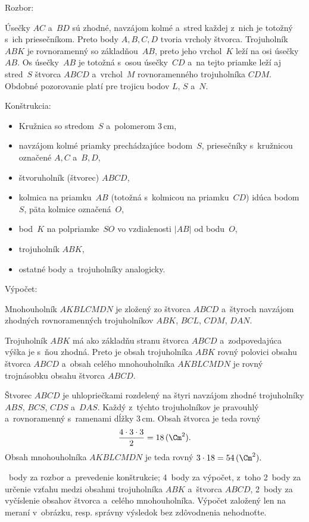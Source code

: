 {%
Rozbor:

Úsečky $AC$ a~$BD$ sú zhodné, navzájom kolmé a~stred každej z~nich je totožný s~ich priesečníkom.
Preto body $A,B,C,D$ tvoria vrcholy štvorca.
Trojuholník $ABK$ je rovnoramenný so základňou~$AB$, preto jeho vrchol~$K$ leží na osi úsečky~$AB$.
Os úsečky~$AB$ je totožná s~osou úsečky~$CD$ a~na tejto priamke leží aj stred~$S$ štvorca $ABCD$ a~vrchol~$M$ rovnoramenného trojuholníka $CDM$.
Obdobné pozorovanie platí pre trojicu bodov $L$, $S$ a~$N$.
%

\medskip

Konštrukcia:
\begin{itemize}
\item Kružnica so stredom~$S$ a~polomerom 3\,cm,
\item navzájom kolmé priamky prechádzajúce bodom~$S$, priesečníky s~kružnicou označené $A,C$ a~$B,D$,
\item štvoruholník (štvorec) $ABCD$,
\item kolmica na priamku~$AB$ (totožná s~kolmicou na priamku~$CD$) idúca bodom~$S$, päta kolmice označená~$O$,
\item bod~$K$ na polpriamke~$SO$ vo vzdialenosti $|AB|$ od bodu~$O$,
\item trojuholník $ABK$,
\item ostatné body a~trojuholníky analogicky.
\end{itemize}

\medskip
Výpočet:

Mnohouholník $AKBLCMDN$ je zložený zo štvorca $ABCD$ a~štyroch navzájom zhodných rovnoramenných trojuholníkov $ABK$, $BCL$, $CDM$, $DAN$.

Trojuholník $ABK$ má ako základňu stranu štvorca $ABCD$ a~zodpovedajúca výška je s~ňou zhodná.
Preto je obsah trojuholníka $ABK$ rovný polovici obsahu štvorca $ABCD$ a~obsah celého mnohouholníka $AKBLCMDN$ je rovný trojnásobku obsahu štvorca $ABCD$.

Štvorec $ABCD$ je uhlopriečkami rozdelený na štyri navzájom zhodné trojuholníky $ABS$, $BCS$, $CDS$ a~$DAS$.
Každý z~týchto trojuholníkov je pravouhlý a~rovnoramenný s~ramenami dĺžky 3\,cm.
Obsah štvorca je teda rovný
$$
\frac{4\cdot3\cdot3}2=18\,(\Cm^2).
$$
Obsah mnohouholníka $AKBLCMDN$ je teda rovný
$
3\cdot 18=54\,(\Cm^2).
$

~body za rozbor a~prevedenie konštrukcie;
4~body za výpočet, z~toho 2~body za určenie vzťahu medzi obsahmi trojuholníka $ABK$ a~štvorca $ABCD$, 2~body za vyčíslenie obsahov štvorca a~celého mnohouholníka.
Výpočet založený len na meraní v~obrázku, resp. správny výsledok bez zdôvodnenia nehodnoťte.
\endhodnotenie
}

